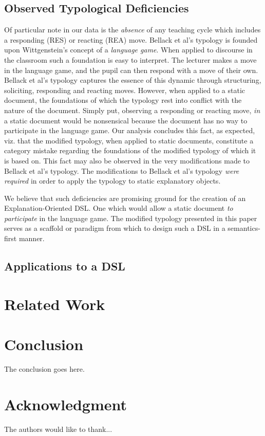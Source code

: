 \documentclass[conference]{IEEEtran}
\begin{document}
\subsection{Observed Typological Deficiencies}
Of particular note in our data is the \emph{absence} of any teaching cycle which
includes a responding (RES) or reacting (REA) move. Bellack et al's typology is
founded upon Wittgenstein's concept of a \emph{language game}. When applied to
discourse in the classroom such a foundation is easy to interpret. The lecturer
makes a move in the language game, and the pupil can then respond with a move of
their own. Bellack et al's typology captures the essence of this dynamic through
structuring, soliciting, responding and reacting moves. However, when applied to
a static document, the foundations of which the typology rest into conflict with
the nature of the document. Simply put, observing a responding or reacting move,
\emph{in} a static document would be nonsensical because the document has no way
to participate in the language game. Our analysis concludes this fact, as
expected, viz. that the modified typology, when applied to static documents,
constitute a category mistake regarding the foundations of the modified typology
of which it is based on. This fact may also be observed in the very
modifications made to Bellack et al's typology. The modifications to Bellack et
al's typology \emph{were required} in order to apply the typology to static
explanatory objects.

We believe that such deficiencies are promising ground for the creation of an
Explanation-Oriented DSL. One which would allow a static document \emph{to
  participate} in the language game. The modified typology presented in this
paper serves as a scaffold or paradigm from which to design such a DSL in a
semantics-first \cite{erwig2011semantics} manner.

\subsection{Applications to a DSL}


\section{Related Work}


\section{Conclusion}

The conclusion goes here.


\section*{Acknowledgment}

The authors would like to thank...



\end{document}
